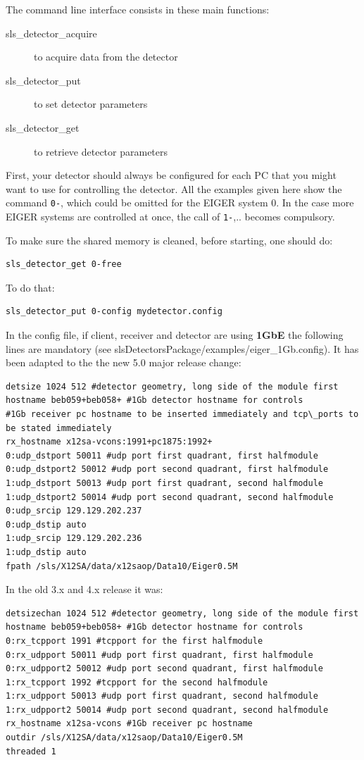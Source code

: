 \documentclass{article}
\begin{document}
The command line interface consists in these main functions:
\begin{description}
\item[sls\_detector\_acquire] to acquire data from the detector
\item[sls\_detector\_put] to set detector parameters
\item[sls\_detector\_get] to retrieve detector parameters
\end{description}

First, your detector should always be configured for each PC that you might want to use for controlling the detector. All the examples given here show the command {\tt{0-}}, which could be omitted for the EIGER system $0$. In the case more EIGER systems are controlled at once, the call of {\tt{1-}},.. becomes compulsory. 

To make sure the shared memory is cleaned, before starting, one should do:  
\begin{verbatim}
sls_detector_get 0-free
\end{verbatim}
To do that:
\begin{verbatim}
sls_detector_put 0-config mydetector.config
\end{verbatim}

In the config file, if client, receiver and detector are using \textbf{1GbE} the following lines are mandatory (see slsDetectorsPackage/examples/eiger\_1Gb.config). It has been adapted to the the new 5.0 major release change:
\begin{verbatim}
detsize 1024 512 #detector geometry, long side of the module first
hostname beb059+beb058+ #1Gb detector hostname for controls
#1Gb receiver pc hostname to be inserted immediately and tcp\_ports to be stated immediately
rx_hostname x12sa-vcons:1991+pc1875:1992+
0:udp_dstport 50011 #udp port first quadrant, first halfmodule         
0:udp_dstport2 50012 #udp port second quadrant, first halfmodule       
1:udp_dstport 50013 #udp port first quadrant, second halfmodule       
1:udp_dstport2 50014 #udp port second quadrant, second halfmodule      
0:udp_srcip 129.129.202.237
0:udp_dstip auto
1:udp_srcip 129.129.202.236
1:udp_dstip auto
fpath /sls/X12SA/data/x12saop/Data10/Eiger0.5M
\end{verbatim}
In the old 3.x and 4.x release it was: 
\begin{verbatim}
detsizechan 1024 512 #detector geometry, long side of the module first
hostname beb059+beb058+ #1Gb detector hostname for controls
0:rx_tcpport 1991 #tcpport for the first halfmodule                 
0:rx_udpport 50011 #udp port first quadrant, first halfmodule         
0:rx_udpport2 50012 #udp port second quadrant, first halfmodule       
1:rx_tcpport 1992 #tcpport for the second halfmodule               
1:rx_udpport 50013 #udp port first quadrant, second halfmodule       
1:rx_udpport2 50014 #udp port second quadrant, second halfmodule      
rx_hostname x12sa-vcons #1Gb receiver pc hostname
outdir /sls/X12SA/data/x12saop/Data10/Eiger0.5M
threaded 1
\end{verbatim}
\end{document}
